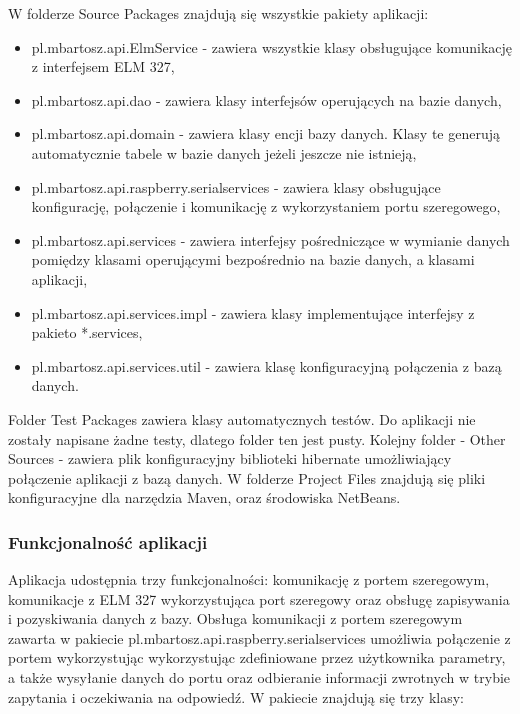 \documentclass[12pt, twoside]{article} %
\numberwithin{equation}{subsection}
\numberwithin{figure}{section}
\numberwithin{table}{section}
\begin{document}
	W folderze Source Packages znajdują się wszystkie pakiety aplikacji:
	
	\begin{itemize}
		\item{pl.mbartosz.api.ElmService - zawiera wszystkie klasy obsługujące komunikację z interfejsem ELM 327,}
		\item{pl.mbartosz.api.dao - zawiera klasy interfejsów operujących na bazie danych,}
		\item{pl.mbartosz.api.domain - zawiera klasy encji bazy danych. Klasy te generują automatycznie tabele w bazie danych jeżeli jeszcze nie istnieją,}
		\item{pl.mbartosz.api.raspberry.serialservices - zawiera klasy obsługujące konfigurację, połączenie i komunikację z wykorzystaniem portu szeregowego,}
		\item{pl.mbartosz.api.services - zawiera interfejsy pośredniczące w wymianie danych pomiędzy klasami operującymi bezpośrednio na bazie danych, a klasami aplikacji, }
		\item{pl.mbartosz.api.services.impl - zawiera klasy implementujące interfejsy z pakieto *.services,}
		\item{pl.mbartosz.api.services.util - zawiera klasę konfiguracyjną połączenia z bazą danych.}
	\end{itemize}
	
	Folder Test Packages zawiera klasy automatycznych testów. Do aplikacji nie zostały napisane żadne testy, dlatego folder ten jest pusty. Kolejny folder - Other Sources - zawiera plik konfiguracyjny biblioteki hibernate umożliwiający połączenie aplikacji z bazą danych. W folderze Project Files znajdują się pliki konfiguracyjne dla narzędzia Maven, oraz środowiska NetBeans.
	
	\subsubsection{Funkcjonalność aplikacji}	
	
	\hspace{0.5cm}Aplikacja udostępnia trzy funkcjonalności: komunikację z portem szeregowym, komunikacje z ELM 327 wykorzystująca port szeregowy oraz obsługę zapisywania i pozyskiwania danych z bazy. Obsługa komunikacji z portem szeregowym zawarta w pakiecie pl.mbartosz.api.raspberry.serialservices umożliwia połączenie z portem wykorzystując wykorzystując zdefiniowane przez użytkownika parametry, a także wysyłanie danych do portu oraz odbieranie informacji zwrotnych w trybie zapytania i oczekiwania na odpowiedź. W pakiecie znajdują się trzy klasy:
	
\end{document}
